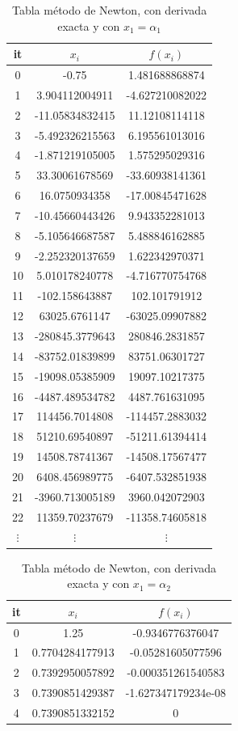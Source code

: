 \documentclass{article} %
\begin{document}
\begin{table}[H]
    \centering
    \begin{tabular}{|c|c|c|}
\hline
it & $x_i$ & $f(x_i)$\\
\hline
0 & -0.75 & 1.481688868874\\
1 & 3.904112004911 & -4.627210082022\\
2 & -11.05834832415 & 11.12108114118\\
3 & -5.492326215563 & 6.195561013016\\
4 & -1.871219105005 & 1.575295029316\\
5 & 33.30061678569 & -33.60938141361\\
6 & 16.0750934358 & -17.00845471628\\
7 & -10.45660443426 & 9.943352281013\\
8 & -5.105646687587 & 5.488846162885\\
9 & -2.252320137659 & 1.622342970371\\
10 & 5.010178240778 & -4.716770754768\\
11 & -102.158643887 & 102.101791912\\
12 & 63025.6761147 & -63025.09907882\\
13 & -280845.3779643 & 280846.2831857\\
14 & -83752.01839899 & 83751.06301727\\
15 & -19098.05385909 & 19097.10217375\\
16 & -4487.489534782 & 4487.761631095\\
17 & 114456.7014808 & -114457.2883032\\
18 & 51210.69540897 & -51211.61394414\\
19 & 14508.78741367 & -14508.17567477\\
20 & 6408.456989775 & -6407.532851938\\
21 & -3960.713005189 & 3960.042072903\\
22 & 11359.70237679 & -11358.74605818\\
$\vdots$ & $\vdots$ & $\vdots$\\
\hline
\end{tabular}
    \caption{Tabla método de Newton, con derivada exacta y con $x_1 = \alpha_1$}
    \label{tab6}
\end{table}

\begin{table}[H]
    \centering
    \begin{tabular}{|c|c|c|}
    \hline
it & $x_i$ & $f(x_i)$\\
\hline
0 & 1.25 & -0.9346776376047\\
1 & 0.7704284177913 & -0.05281605077596\\
2 & 0.7392950057892 & -0.000351261540583\\
3 & 0.7390851429387 & -1.627347179234e-08\\
4 & 0.7390851332152 & 0\\
\hline
\end{tabular}
    \caption{Tabla método de Newton, con derivada exacta y con $x_1 = \alpha_2$}
    \label{tab:newtonalhpa2extacta}
\end{table}
\end{document}
